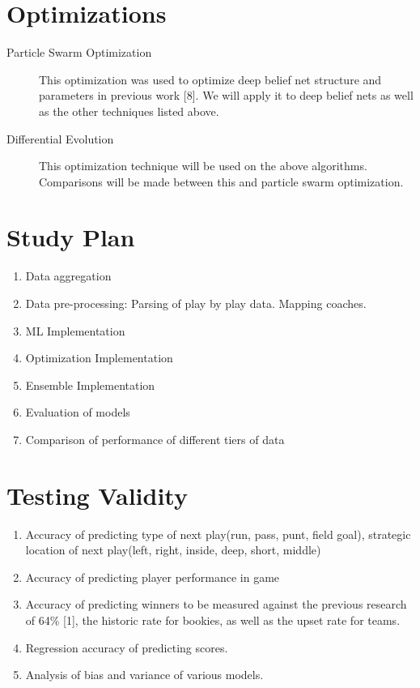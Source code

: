 \documentclass[english]{article}
\begin{document}
\section*{Optimizations}
\begin{description}
\item[{Particle Swarm Optimization}] This optimization was used to optimize deep belief net structure and parameters in previous work [8]. We will apply it to deep belief nets as well as the other techniques listed above.
\item[{Differential Evolution}] This optimization technique will be used on the above algorithms. Comparisons will be made between this and particle swarm optimization.
\end{description}
\section*{Study Plan}
\begin{enumerate}
\item Data aggregation
\item Data pre-processing: Parsing of play by play data. Mapping coaches.
\item ML Implementation
\item Optimization Implementation
\item Ensemble Implementation
\item Evaluation of models
\item Comparison of performance of different tiers of data
\end{enumerate}

\section*{Testing Validity}
\begin{enumerate}
\item Accuracy of predicting type of next play(run, pass, punt, field goal), strategic location of next play(left, right, inside, deep, short, middle) 
\item Accuracy of predicting player performance in game
\item Accuracy of predicting winners to be measured against the previous research of 64\% [1], the historic rate for bookies, as well as the upset rate for teams.
\item Regression accuracy of predicting scores.
\item Analysis of bias and variance of various models.
\end{enumerate}
\end{document}
